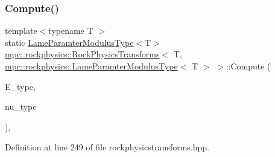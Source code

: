 \subsubsection{\texorpdfstring{Compute()}{Compute()}\hspace{0.1cm}{\footnotesize\ttfamily [6/7]}}
{\footnotesize\ttfamily template$<$typename T $>$ \\
static \mbox{\hyperlink{structmpc_1_1rockphysics_1_1_lame_paramter_modulus_type}{Lame\+Paramter\+Modulus\+Type}}$<$T$>$ \mbox{\hyperlink{structmpc_1_1rockphysics_1_1_rock_physics_transforms}{mpc\+::rockphysics\+::\+Rock\+Physics\+Transforms}}$<$ T, \mbox{\hyperlink{structmpc_1_1rockphysics_1_1_lame_paramter_modulus_type}{mpc\+::rockphysics\+::\+Lame\+Paramter\+Modulus\+Type}}$<$ T $>$ $>$\+::Compute (\begin{DoxyParamCaption}\item[{const \mbox{\hyperlink{structmpc_1_1rockphysics_1_1_youngs_modulus_type}{mpc\+::rockphysics\+::\+Youngs\+Modulus\+Type}}$<$ T $>$ \&}]{E\+\_\+type,  }\item[{const \mbox{\hyperlink{structmpc_1_1rockphysics_1_1_poissons_ratio_type}{mpc\+::rockphysics\+::\+Poissons\+Ratio\+Type}}$<$ T $>$ \&}]{nu\+\_\+type }\end{DoxyParamCaption})\hspace{0.3cm}{\ttfamily [inline]}, {\ttfamily [static]}}



Definition at line 249 of file rockphysicstransforms.\+hpp.

\mbox{\label{structmpc_1_1rockphysics_1_1_rock_physics_transforms_3_01_t_00_01mpc_1_1rockphysics_1_1_lame_para5e1496021e3962f82419b3f52eb8942_afefb8b5bba91818370a629a0ff035c35}} 
